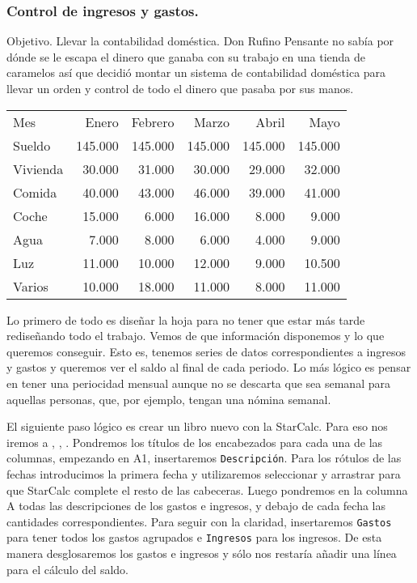 \subsubsection{Control de ingresos y gastos.} 
Objetivo. Llevar la contabilidad doméstica. 
Don Rufino Pensante no sabía por dónde se le escapa el dinero que 
ganaba con su trabajo en una tienda de caramelos así que decidió 
montar un sistema de contabilidad doméstica para llevar un orden y
control de todo el dinero que pasaba por sus manos.\\

\begin{table}
\centering
\begin{tabular}{|l|r|r|r|r|r|}
\hline
Mes & Enero & Febrero & Marzo & Abril & Mayo\\
Sueldo & 145.000 & 145.000 & 145.000 & 145.000 & 145.000\\
Vivienda & 30.000 & 31.000 & 30.000 & 29.000 & 32.000\\
Comida & 40.000 & 43.000 & 46.000 & 39.000 & 41.000\\
Coche & 15.000 & 6.000 & 16.000 & 8.000 & 9.000\\
Agua & 7.000 & 8.000 & 6.000 & 4.000 & 9.000\\
Luz & 11.000 & 10.000 & 12.000 & 9.000 & 10.500\\
Varios & 10.000 & 18.000 & 11.000 & 8.000 & 11.000\\
\hline
\end{tabular}
\end{table}

\noindent Lo  primero de  todo es  diseñar la hoja  para no  tener que
estar más tarde rediseñando todo  el trabajo. Vemos de que información
disponemos y  lo que  queremos conseguir. Esto  es, tenemos  series de
datos correspondientes a ingresos y gastos  y queremos ver el saldo al
final de cada periodo. Lo más lógico es pensar en tener una periocidad
mensual aunque no se descarta  que sea semanal para aquellas personas,
que, por ejemplo, tengan una nómina semanal.

El siguiente paso lógico es crear un libro nuevo con la StarCalc. Para
eso nos iremos a , , .
Pondremos los títulos de los encabezados para cada una de las columnas,
empezando en A1, insertaremos {\tt Descripción}. Para los rótulos de las
fechas introducimos la primera fecha y utilizaremos seleccionar y arrastrar
para que StarCalc complete el resto de las cabeceras.
Luego pondremos en la columna A todas las descripciones de los gastos e
ingresos, y debajo de cada fecha las cantidades correspondientes. Para seguir
con la claridad, insertaremos {\tt Gastos} para tener todos los gastos
agrupados e {\tt Ingresos} para los ingresos. De esta manera desglosaremos
los gastos e ingresos y sólo nos restaría añadir una línea para el cálculo del
saldo.

